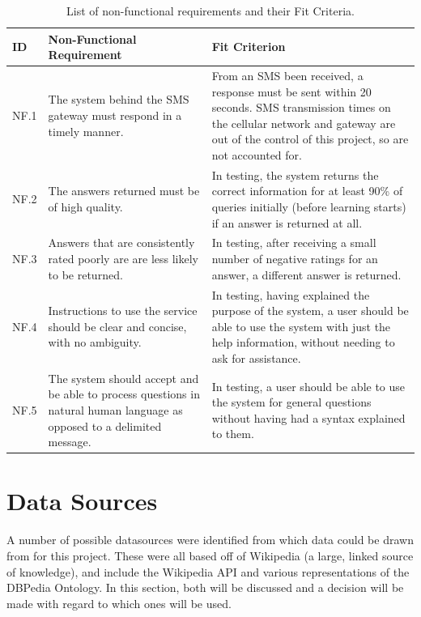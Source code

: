 \documentclass[authoryearcitations]{UoYCSproject}
\begin{document}
\begin{table}
\begin{center}
    \begin{tabular}{| p{0.8cm} | p{6.0cm} | p{6.0cm} |}
    \hline
    ID & Non-Functional Requirement & Fit Criterion \\ \hline
    NF.1 & The system behind the SMS gateway must respond in a timely manner.  & From an SMS been received, a response must be sent within 20 seconds.  SMS transmission times on the cellular network and gateway are out of the control of this project, so are not accounted for. \\ \hline
    NF.2 & The answers returned must be of high quality.  & In testing, the system returns the correct information for at least 90\% of queries initially (before learning starts) if an answer is returned at all. \\ \hline
    NF.3 & Answers that are consistently rated poorly are are less likely to be returned. & In testing, after receiving a small number of negative ratings for an answer, a different answer is returned. \\ \hline
    NF.4 &Instructions to use the service should be clear and concise, with no ambiguity.  & In testing, having explained the purpose of the system, a user should be able to use the system with just the help information, without needing to ask for assistance. \\ \hline  
    NF.5 &The system should accept and be able to process questions in natural human language as opposed to a delimited message. & In testing, a user should be able to use the system for general questions without having had a syntax explained to them. \\ \hline
    \end{tabular}
    \caption{List of non-functional requirements and their Fit Criteria.}
    \label{table:nonFunctionalRequirementsFitCrit}
\end{center}
\end{table}

\section{Data Sources}
A number of possible datasources were identified from which data could be drawn from for this project.  These were all based off of Wikipedia (a large, linked source of knowledge), and include the Wikipedia API and various representations of the DBPedia Ontology.  In this section, both will be discussed and a decision will be made with regard to which ones will be used.
\end{document}
